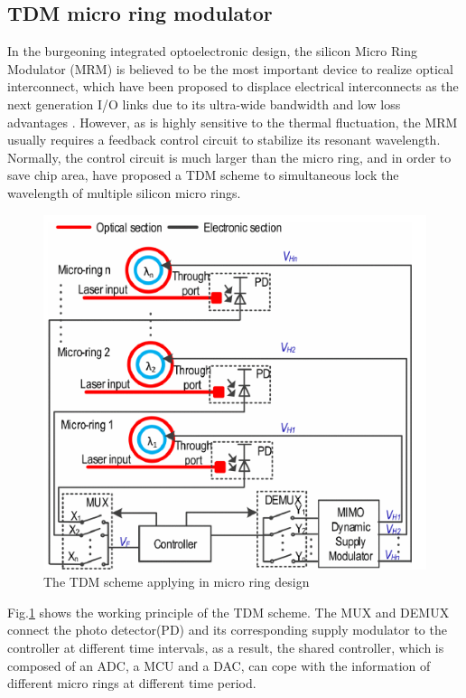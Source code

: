 \documentclass[journal]{IEEEtran}
\begin{document}
\subsection{TDM micro ring modulator}
In the burgeoning integrated optoelectronic design, the silicon Micro Ring Modulator (MRM) is believed to be the most important device to realize optical interconnect, which have been proposed to displace electrical interconnects as the next generation I/O links due to its ultra-wide bandwidth and low loss advantages \cite{wangzhicheng}. However, as is highly sensitive to the thermal fluctuation, the MRM usually requires a feedback control circuit to stabilize its resonant wavelength. Normally, the control circuit is much larger than the micro ring, and in order to save chip area, \cite{wangzhicheng} have proposed a TDM scheme to simultaneous lock the wavelength of multiple silicon micro rings.
\begin{figure}[t!]
    \centering
    \includegraphics[width=\linewidth]{pic/TDM/MRM.pdf}
    \caption{The TDM scheme applying in micro ring design}
    \label{fig:MRM}
\end{figure}

Fig.\ref{fig:MRM} shows the working principle of the TDM scheme. The MUX and DEMUX connect the photo detector(PD) and its corresponding supply modulator to the controller at different time intervals, as a result, the shared controller, which is composed of an ADC, a MCU and a DAC, can cope with the information of different micro rings at different time period.
\end{document}
